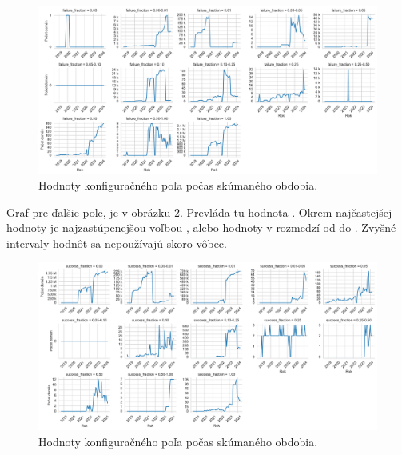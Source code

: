 \begin{figure}[!htb]
\begin{center}
 \includegraphics[scale=0.447]{obrazky-figures/httparchive_nel_config_ff_dist.pdf}
 \caption{Hodnoty konfiguračného poľa  počas skúmaného obdobia.}
 \label{fig:httparchive-nel-config-ff-dist}
\end{center}
\end{figure}

\pagebreak

Graf pre ďalšie pole,  je v obrázku \ref{fig:httparchive-nel-config-sf-dist}. 
Prevláda tu hodnota .
Okrem najčastejšej hodnoty je najzastúpenejšou voľbou , alebo hodnoty v rozmedzí od  do .
Zvyšné intervaly hodnôt sa nepoužívajú skoro vôbec.

\begin{figure}[!htb]
\begin{center}
 \includegraphics[scale=0.447]{obrazky-figures/httparchive_nel_config_sf_dist.pdf}
 \caption{Hodnoty konfiguračného poľa  počas skúmaného obdobia.}
 \label{fig:httparchive-nel-config-sf-dist}
\end{center}
\end{figure}

